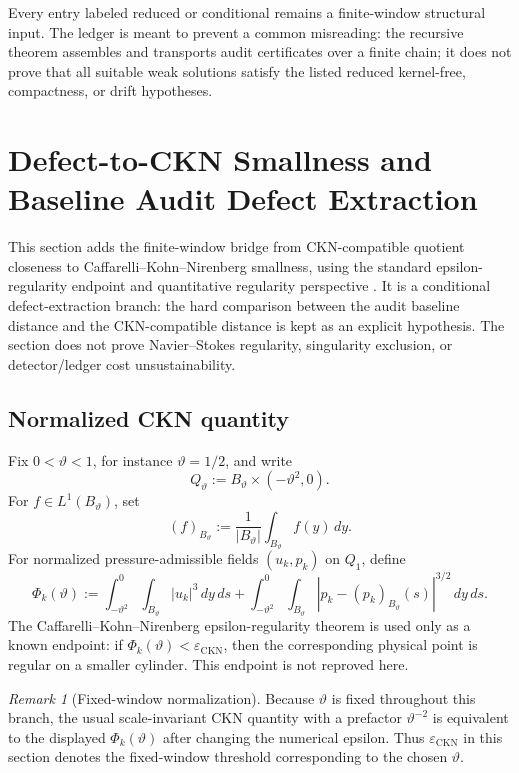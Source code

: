 \documentclass[11pt]{article}
\numberwithin{equation}{section}
\theoremstyle{plain}
\theoremstyle{definition}
\theoremstyle{remark}
\newtheorem{remark}[theorem]{Remark}
\begin{document}
Every entry labeled reduced or conditional remains a finite-window structural
input.  The ledger is meant to prevent a common misreading: the recursive
theorem assembles and transports audit certificates over a finite chain; it
does not prove that all suitable weak solutions satisfy the listed reduced
kernel-free, compactness, or drift hypotheses.


\section{Defect-to-CKN Smallness and Baseline Audit Defect Extraction}
\label{sec:ckn-branch}

This section adds the finite-window bridge from CKN-compatible quotient closeness to Caffarelli--Kohn--Nirenberg smallness, using the standard epsilon-regularity endpoint and quantitative regularity perspective \cite{CKN1982,Lin1998,SereginLectureNotes,BarkerPrange2021,AlbrittonBarkerPrange2023}.  It is a conditional
defect-extraction branch: the hard comparison between the audit baseline
distance and the CKN-compatible distance is kept as an explicit hypothesis.
The section does not prove Navier--Stokes regularity, singularity exclusion,
or detector/ledger cost unsustainability.

\subsection{Normalized CKN quantity}

Fix \(0<\vartheta<1\), for instance \(\vartheta=1/2\), and write
\[
  Q_\vartheta:=B_\vartheta\times(-\vartheta^2,0).
\]
For \(f\in L^1(B_\vartheta)\), set
\[
  (f)_{B_\vartheta}
  :=
  \frac{1}{|B_\vartheta|}\int_{B_\vartheta}f(y)\,dy.
\]
For normalized pressure-admissible fields \((u_k,p_k)\) on \(Q_1\), define
\[
  \Phi_k(\vartheta)
  :=
  \int_{-\vartheta^2}^{0}\int_{B_\vartheta}|u_k|^3\,dy\,ds
  +
  \int_{-\vartheta^2}^{0}\int_{B_\vartheta}
  |p_k-(p_k)_{B_\vartheta}(s)|^{3/2}\,dy\,ds .
\]
The Caffarelli--Kohn--Nirenberg epsilon-regularity theorem \cite{CKN1982} is used only as a
known endpoint: if \(\Phi_k(\vartheta)<\varepsilon_{\mathrm{CKN}}\), then the
corresponding physical point is regular on a smaller cylinder.  This endpoint
is not reproved here.

\begin{remark}[Fixed-window normalization]
Because \(\vartheta\) is fixed throughout this branch, the usual scale-invariant
CKN quantity with a prefactor \(\vartheta^{-2}\) is equivalent to the displayed
\(\Phi_k(\vartheta)\) after changing the numerical epsilon.  Thus
\(\varepsilon_{\mathrm{CKN}}\) in this section denotes the fixed-window
threshold corresponding to the chosen \(\vartheta\).
\end{remark}
\end{document}
